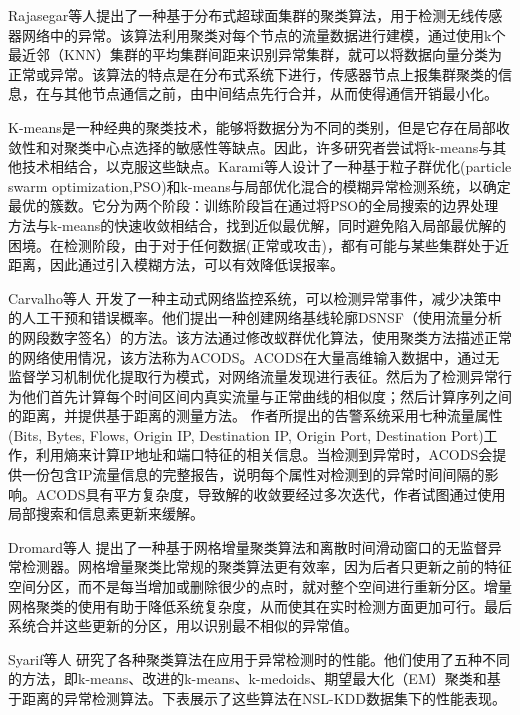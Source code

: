 Rajasegar等人\cite{2014Hyperspherical}提出了一种基于分布式超球面集群的聚类算法，用于检测无线传感器网络中的异常。该算法利用聚类对每个节点的流量数据进行建模，通过使用k个最近邻（KNN）集群的平均集群间距来识别异常集群，就可以将数据向量分类为正常或异常。该算法的特点是在分布式系统下进行，传感器节点上报集群聚类的信息，在与其他节点通信之前，由中间结点先行合并，从而使得通信开销最小化。


K-means是一种经典的聚类技术，能够将数据分为不同的类别，但是它存在局部收敛性和对聚类中心点选择的敏感性等缺点。因此，许多研究者尝试将k-means与其他技术相结合，以克服这些缺点。Karami等人\cite{2015Karami}设计了一种基于粒子群优化(particle swarm optimization,PSO)和k-means与局部优化混合的模糊异常检测系统，以确定最优的簇数。它分为两个阶段：训练阶段旨在通过将PSO的全局搜索的边界处理方法与k-means的快速收敛相结合，找到近似最优解，同时避免陷入局部最优解的困境。在检测阶段，由于对于任何数据(正常或攻击)，都有可能与某些集群处于近距离，因此通过引入模糊方法，可以有效降低误报率。



Carvalho等人\cite{carvalho2016unsupervised} 开发了一种主动式网络监控系统，可以检测异常事件，减少决策中的人工干预和错误概率。他们提出一种创建网络基线轮廓DSNSF（使用流量分析的网段数字签名）的方法。该方法通过修改蚁群优化算法，使用聚类方法描述正常的网络使用情况，该方法称为ACODS。ACODS在大量高维输入数据中，通过无监督学习机制优化提取行为模式，对网络流量发现进行表征。然后为了检测异常行为他们首先计算每个时间区间内真实流量与正常曲线的相似度；然后计算序列之间的距离，并提供基于距离的测量方法。
作者所提出的告警系统采用七种流量属性(Bits, Bytes, Flows, Origin IP, Destination IP, Origin Port, Destination Port)工作，利用熵来计算IP地址和端口特征的相关信息。当检测到异常时，ACODS会提供一份包含IP流量信息的完整报告，说明每个属性对检测到的异常时间间隔的影响。ACODS具有平方复杂度，导致解的收敛要经过多次迭代，作者试图通过使用局部搜索和信息素更新来缓解。

Dromard等人\cite{dromard2016online} 提出了一种基于网格增量聚类算法和离散时间滑动窗口的无监督异常检测器。网格增量聚类比常规的聚类算法更有效率，因为后者只更新之前的特征空间分区，而不是每当增加或删除很少的点时，就对整个空间进行重新分区。增量网格聚类的使用有助于降低系统复杂度，从而使其在实时检测方面更加可行。最后系统合并这些更新的分区，用以识别最不相似的异常值。


Syarif等人\cite{2012syarif} 研究了各种聚类算法在应用于异常检测时的性能。他们使用了五种不同的方法，即k-means、改进的k-means、k-medoids、期望最大化（EM）聚类和基于距离的异常检测算法。下表展示了这些算法在NSL-KDD数据集下的性能表现。

